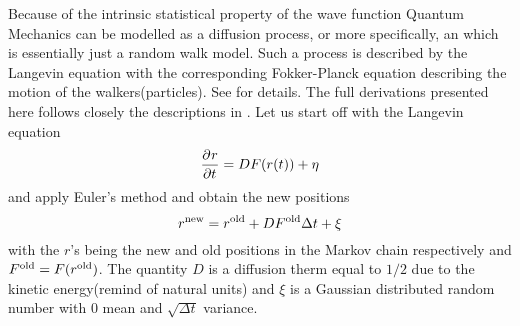         Because of the intrinsic statistical property of the wave function
        Quantum Mechanics can be modelled as a diffusion process, or more
        specifically, an  which is
        essentially just a random walk model. Such a process is described by
        the Langevin equation with the corresponding Fokker-Planck equation
        describing the motion of the walkers(particles). See \cite{numstoch,
        compphysThijssen, vmc} for details. The full derivations presented here
        follows closely the descriptions in \cite{compphysThijssen, vmc}. Let
        us start off with the Langevin equation
            \begin{equation}
                \langevin
                \label{eq:langevin}
            \end{equation}
        and apply Euler's method and obtain the new positions
            \begin{equation}
                r^{\text{new}} = r^{\text{old}} + DF^{\text{old}}\Delta t + \xi
                \label{eq:rnewdef}
            \end{equation}
        with the $r$'s being the new and old positions in the Markov chain
        respectively and $F^{\text{old}}=F(r^{\text{old}})$. The quantity $D$ is a diffusion
        therm equal to $1/2$ due to the kinetic energy(remind of natural units)
        and $\xi$ is a Gaussian distributed random number with $0$ mean and
        $\sqrt{\Delta t}$ variance.


